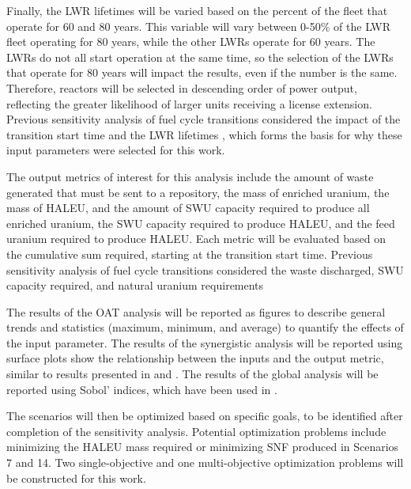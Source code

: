 Finally, the \gls{LWR} lifetimes will be varied based 
on the percent of the fleet that operate for 60 and 80 years. This 
variable will vary between 0-50\% of the \gls{LWR} fleet operating for 80 
years, while the other \glspl{LWR} operate for 60 years. The 
\glspl{LWR} do not all start operation at the same time, so the 
selection of the \glspl{LWR} that operate for 80 years will impact the results, 
even if the number is the same. Therefore, reactors will be selected in 
descending order of power output, reflecting the greater likelihood of 
larger units receiving a license extension. Previous sensitivity analysis of 
fuel cycle transitions considered the impact of the transition start time 
and the \gls{LWR} lifetimes \cite{chee_sensitivity_2019,feng_sensitivity_2020},
which forms the basis for why these input parameters were selected for this 
work.

The output metrics of 
interest for this analysis include the amount of waste generated that 
must be sent to a repository, the mass of enriched uranium, the mass of 
\gls{HALEU}, and 
the amount of \gls{SWU} capacity required to produce all enriched uranium, the 
\gls{SWU} capacity required to produce \gls{HALEU}, and the feed uranium 
required to produce \gls{HALEU}. Each metric will be evaluated based on the 
cumulative sum required, starting at the transition start time. Previous 
sensitivity analysis of fuel cycle transitions considered the waste 
discharged, \gls{SWU} 
capacity required, and natural uranium requirements
\cite{richards_application_2021,feng_sensitivity_2020} 

The results of the \gls{OAT} analysis will be reported as figures 
to describe general trends and statistics (maximum, minimum, and 
average) to quantify the effects of the input parameter. 
The results 
of the synergistic analysis will be reported using surface plots show 
the relationship 
between the inputs and the output metric, similar to results presented in 
\cite{chee_sensitivity_2019} and \cite{passerini_systematic_2014}.
The results of the global analysis will be reported using Sobol' 
indices, which have been used in \cite{richards_application_2021}. 

The scenarios will then be optimized based on specific goals, to be 
identified after completion of the sensitivity analysis. 
Potential 
optimization problems include minimizing the \gls{HALEU} mass required 
or minimizing \gls{SNF} produced in Scenarios 7 and 14. Two 
single-objective and one multi-objective optimization problems will be 
constructed for this work.  

